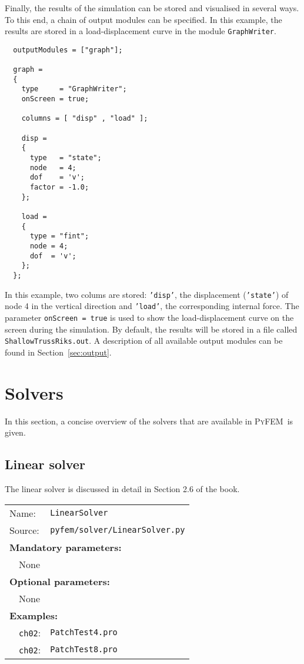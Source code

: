 \documentclass{article}
\newcommand{\progname}{\textsc{PyFEM}}
\newenvironment{graybox}{

\begin{center}\noindent\ignorespaces\begin{Sbox}\begin{minipage}{10cm}}%
{\end{minipage}\end{Sbox}%
\fcolorbox{black}{mygray}{\TheSbox}\vspace{5mm}\ignorespacesafterend\end{center}}
\begin{document}
Finally, the results of the simulation can be stored and visualised in several ways. To this end, a chain of output modules can be 
specified. In this example, the results are stored in a load-displacement curve in the module \texttt{GraphWriter}.

\begin{graybox}
\begin{verbatim}
  outputModules = ["graph"];

  graph =
  {
    type     = "GraphWriter";
    onScreen = true;

    columns = [ "disp" , "load" ];

    disp =
    {
      type   = "state";
      node   = 4;
      dof    = 'v';
      factor = -1.0;
    };
  
    load =
    { 
      type = "fint";
      node = 4;
      dof  = 'v';
    };
  };
\end{verbatim}
\end{graybox}
In this example, two colums are stored: \texttt{'disp'}, the displacement (\texttt{'state'}) of node 4 in the vertical 
direction and \texttt{'load'}, the corresponding internal force. The parameter \texttt{onScreen = true} is used
to show the load-displacement curve on the screen during the simulation. By default, the results will be stored in a file called
\texttt{ShallowTrussRiks.out}. A description of all available output 
modules can be found in Section~\ref{sec:output}.

\section{Solvers}\label{sec:solver}

In this section, a concise overview of the solvers that are available in \progname~is given.

\subsection{Linear solver}

The linear solver is discussed in detail in Section 2.6 of the book.

\begin{tabular}{p{20mm}p{74mm}}
Name:    & \texttt{LinearSolver} \\
Source:  & \texttt{pyfem/solver/LinearSolver.py} \\
\multicolumn{2}{l}{\textbf{Mandatory parameters:}} \\
~~None & \\
\multicolumn{2}{l}{\textbf{Optional parameters:}} \\ 
~~None & \\
\multicolumn{2}{l}{\textbf{Examples:}}\\
~~\texttt{ch02}: & \texttt{PatchTest4.pro}\\
~~\texttt{ch02}: & \texttt{PatchTest8.pro}
\end{tabular}
\end{document}
